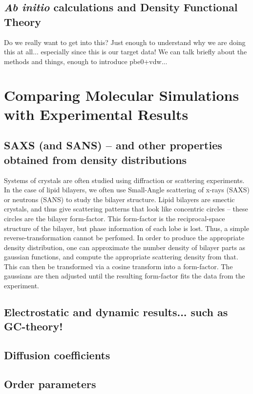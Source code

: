 \subsection{\emph{Ab initio} calculations and Density Functional Theory}

Do we really want to get into this? Just enough to understand why we are doing this at all... especially since this is our target data! We
can talk briefly about the methods and things, enough to introduce pbe0+vdw...
\section{Comparing Molecular Simulations with Experimental Results}
\subsection{SAXS (and SANS) -- and other properties obtained from density distributions}
Systems of crystals are often studied using diffraction or scattering experiments. 
In the case of lipid bilayers, we often use Small-Angle scattering of x-rays (SAXS) or neutrons (SANS) 
to study the bilayer structure. Lipid bilayers are smectic crystals, and thus give scattering
patterns that look like concentric circles -- these circles are the bilayer form-factor. This form-factor
is the reciprocal-space structure of the bilayer, but phase information of each lobe is lost. 
Thus, a simple reverse-transformation cannot be perfomed.
In order to produce the appropriate density distribution, one can approximate the number density of bilayer parts as gaussian functions, and 
compute the appropriate scattering density from that. This can then be transformed via a cosine transform
into a form-factor. The gaussians are then adjusted
until the resulting form-factor fits the data from the experiment.
\subsection{Electrostatic and dynamic results... such as GC-theory!}

\subsection{Diffusion coefficients}

\subsection{Order parameters}

